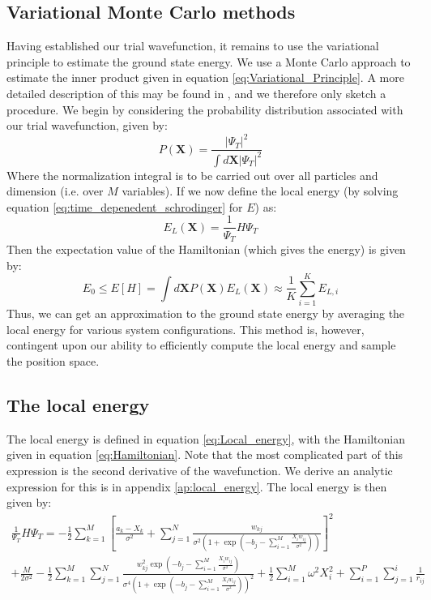 \documentclass[a4paper, 10pt]{article}
\begin{document}
	\subsection{Variational Monte Carlo methods}
	Having established our trial wavefunction, it remains to use the variational principle to estimate the ground state energy. We use a Monte Carlo approach to estimate the inner product given in equation \ref{eq:Variational_Principle}. A more detailed description of this may be found in \cite{Hjorth-Jensen2015}, and we therefore only sketch a procedure. We begin by considering the probability distribution associated with our trial wavefunction, given by:
	\begin{equation}
	P(\mathbf{X})=\frac{|\Psi_T|^2}{\int d\mathbf{X}|\Psi_T|^2}
	\end{equation}
	Where the normalization integral is to be carried out over all particles and dimension (i.e. over $M$ variables). If we now define the local energy (by solving equation \ref{eq:time_depenedent_schrodinger} for $E$) as:
	\begin{equation}\label{eq:Local_energy}
	E_L(\mathbf{X})=\frac{1}{\Psi_T}H\Psi_T
	\end{equation}
	Then the expectation value of the Hamiltonian (which gives the energy) is given by:
	\begin{equation}\label{eq:energy_in_state_space}
	E_0 \leq E[H]=\int d\mathbf{X}P(\mathbf{X})E_L(\mathbf{X})\approx \frac{1}{K}\sum_{i=1}^{K}E_{L,i}
	\end{equation}
	Thus, we can get an approximation to the ground state energy by averaging the local energy for various system configurations. This method is, however, contingent upon our ability to efficiently compute the local energy and sample the position space.
	\subsection{The local energy}
	The local energy is defined in equation \ref{eq:Local_energy}, with the Hamiltonian given in equation \ref{eq:Hamiltonian}. Note that the most complicated part of this expression is the second derivative of the wavefunction. We derive an analytic expression for this is in appendix \ref{ap:local_energy}. The local energy is then given by:
	\begin{equation}
	\begin{split}
	\frac{1}{\Psi_T}H\Psi_T=-\frac{1}{2}\sum_{k=1}^M\left[\frac{a_k-X_k}{\sigma^2}+\sum_{j=1}^N \frac{w_{kj}}{\sigma^2 \left(1+ \exp \left(-b_j-\sum_{i=1}^{M} \frac{X_iw_{ij}}{\sigma^2}\right)\right)}\right]^2\\
	+\frac{M}{2\sigma^2}-\frac{1}{2}\sum_{k=1}^M\sum_{j=1}^N \frac{w_{kj}^2 \exp \left(-b_j-\sum_{i=1}^{M}\frac{X_iw_{ij}}{\sigma^2} \right)}{\sigma^4\left(1+ \exp \left(-b_j-\sum_{i=1}^{M} \frac{X_iw_{ij}}{\sigma^2}\right)\right)^2}+\frac{1}{2}\sum_{i=1}^M\omega^2 X_i^2+\sum_{i=1}^P \sum_{j=1}^i \frac{1}{r_{ij}}
	\end{split}
	\end{equation}
\end{document}
